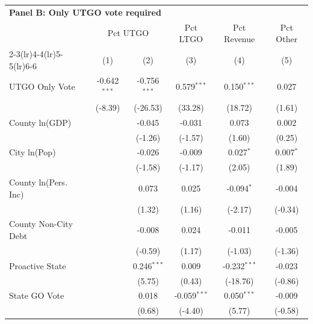 \begingroup
\centering
\begin{tabular*}{\textwidth}{@{\extracolsep{\fill}}lccccc}
\multicolumn{5}{l}{\textbf{Panel B: Only UTGO vote required}}\\

\addlinespace
   \toprule
    & \multicolumn{2}{c}{Pct UTGO} & Pct LTGO & Pct Revenue & Pct Other\\
   \cmidrule(lr){2-3}\cmidrule(lr){4-4}\cmidrule(lr){5-5}\cmidrule(lr){6-6}
                        & (1)            & (2)            & (3)            & (4)            & (5)\\  
   \midrule 
   UTGO Only Vote       & -0.642$^{***}$ & -0.756$^{***}$ & 0.579$^{***}$  & 0.150$^{***}$  & 0.027\\   
                        & (-8.39)       & (-26.53)      & (33.28)       & (18.72)       & (1.61)\\   
   County ln(GDP)       &                & -0.045         & -0.031         & 0.073          & 0.002\\   
                        &                & (-1.26)       & (-1.57)       & (1.60)        & (0.25)\\   
   City ln(Pop)         &                & -0.026         & -0.009         & 0.027$^{*}$    & 0.007$^{*}$\\   
                        &                & (-1.58)       & (-1.17)       & (2.05)        & (1.89)\\   
   County ln(Pers. Inc) &                & 0.073          & 0.025          & -0.094$^{*}$   & -0.004\\   
                        &                & (1.32)        & (1.16)        & (-2.17)       & (-0.34)\\   
   County Non-City Debt &                & -0.008         & 0.024          & -0.011         & -0.005\\   
                        &                & (-0.59)       & (1.17)        & (-1.03)       & (-1.36)\\   
   Proactive State      &                & 0.246$^{***}$  & 0.009          & -0.232$^{***}$ & -0.023\\   
                        &                & (5.75)        & (0.43)        & (-18.76)      & (-0.86)\\   
   State GO Vote        &                & 0.018          & -0.059$^{***}$ & 0.050$^{***}$  & -0.009\\   
                        &                & (0.68)        & (-4.40)       & (5.77)        & (-0.58)\\   

\end{tabular*}
